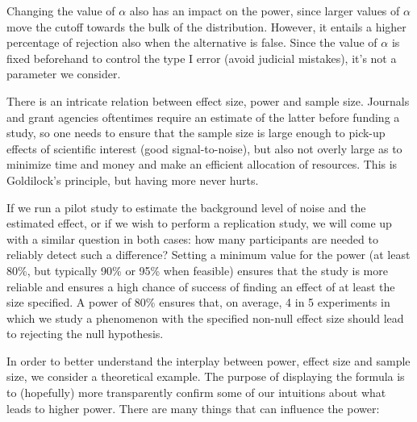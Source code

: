 \documentclass[
  11pt,
  letterpaper,
]{scrbook}
\theoremstyle{definition}
\theoremstyle{remark}
\begin{document}
Changing the value of \(\alpha\) also has an impact on the power, since
larger values of \(\alpha\) move the cutoff towards the bulk of the
distribution. However, it entails a higher percentage of rejection also
when the alternative is false. Since the value of \(\alpha\) is fixed
beforehand to control the type I error (avoid judicial mistakes), it's
not a parameter we consider.

There is an intricate relation between effect size, power and sample
size. Journals and grant agencies oftentimes require an estimate of the
latter before funding a study, so one needs to ensure that the sample
size is large enough to pick-up effects of scientific interest (good
signal-to-noise), but also not overly large as to minimize time and
money and make an efficient allocation of resources. This is Goldilock's
principle, but having more never hurts.

If we run a pilot study to estimate the background level of noise and
the estimated effect, or if we wish to perform a replication study, we
will come up with a similar question in both cases: how many
participants are needed to reliably detect such a difference? Setting a
minimum value for the power (at least 80\%, but typically 90\% or 95\%
when feasible) ensures that the study is more reliable and ensures a
high chance of success of finding an effect of at least the size
specified. A power of 80\% ensures that, on average, 4 in 5 experiments
in which we study a phenomenon with the specified non-null effect size
should lead to rejecting the null hypothesis.

In order to better understand the interplay between power, effect size
and sample size, we consider a theoretical example. The purpose of
displaying the formula is to (hopefully) more transparently confirm some
of our intuitions about what leads to higher power. There are many
things that can influence the power:
\end{document}

